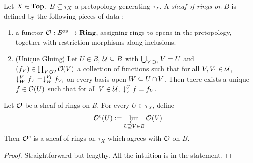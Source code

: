 \begin{lem}
  
  Let $X \in \mathbf{Top}$, $B \subseteq \tau_X$ a pretopology generating $\tau_X$.
  A \emph{sheaf of rings on $B$} is defined by 
  the following pieces of data : 
  \begin{enumerate}
    \item a functor $\mathcal{O} : B^{op} \to \mathbf{Ring}$, assigning rings to 
    opens in the pretopology, together with restriction morphisms along 
    inclusions. 
    \item (Unique Gluing)
    Let $U \in B$, $\mathcal{U} \subseteq B$ with $\bigcup_{V \in \mathcal{U}} V = U$
    and $(f_V) \in \prod_{V \in \mathcal{U}} \mathcal{O}(V)$ a collection of functions
    such that for all $V, V_1 \in \mathcal{U}$,
    $\downarrow_{W}^{V} f_V = \downarrow_{W}^{V_1} f_{V_1}$ 
    on every basis open $W \subseteq U \cap V$.
    Then there exists a unique $f \in \mathcal{O}(U)$ such that
    for all $V \in \mathcal{U}$, $\downarrow_{V}^{U} f = f_V$.
  \end{enumerate}

  Let $\mathcal{O}$ be a sheaf of rings on $B$.
  For every $U \in \tau_X$,
  define \[
    \mathcal{O}^e(U) := \varprojlim_{U\supseteq V \in B} \mathcal{O}(V)
  \]
  Then $\mathcal{O}^e$ is a sheaf of rings on $\tau_X$ 
  which agrees with $\mathcal{O}$ on $B$.
\end{lem}
\begin{proof}
  Straightforward but lengthy.  
  All the intuition is in the statement. 
\end{proof}


